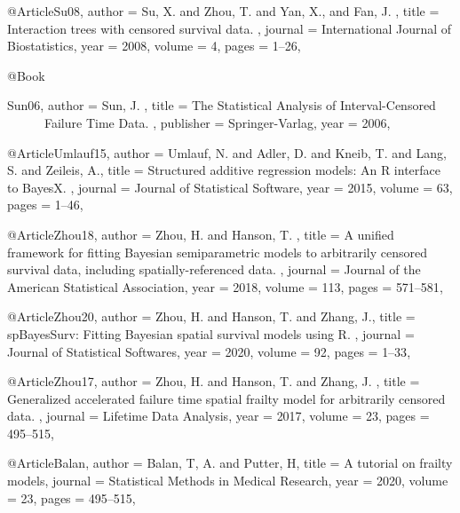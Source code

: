  

@Article{Su08,
   author =   {Su, X. and Zhou, T. and Yan, X., and Fan, J. },
   title =    { Interaction trees with censored survival data. },
   journal =      {International Journal of Biostatistics},
   year =     {2008},
   volume =   {4},
   pages =    {1--26},
 }

 


@Book{Sun06,
   author =   {Sun, J. },
   title =    { The Statistical Analysis of Interval-Censored
      Failure Time Data.  },
   publisher =      {Springer-Varlag},
   year =     {2006},
   
 }

 


@Article{Umlauf15,
   author =   {Umlauf, N. and Adler, D. and Kneib, T. and Lang, S. and Zeileis, A.},
   title =    { Structured additive regression models: An R interface to BayesX. },
   journal =      {Journal of Statistical Software},
   year =     {2015},
   volume =   {63},
   pages =    {1--46},
 }



@Article{Zhou18,
   author =   {Zhou, H. and Hanson, T. },
   title =    { A unified framework for fitting Bayesian semiparametric models to arbitrarily censored survival data, including spatially-referenced data.  },
   journal =      {Journal of the American Statistical Association},
   year =     {2018},
   volume =   {113},
   pages =    {571--581},
 }

 


@Article{Zhou20,
   author =   {Zhou, H. and Hanson, T. and Zhang, J.},
   title =    { spBayesSurv: Fitting Bayesian spatial survival
models using R.   },
   journal =      {Journal of Statistical Softwares},
   year =     {2020},
   volume =   {92},
   pages =    {1--33},
 }

 







@Article{Zhou17,
   author =   {Zhou, H. and Hanson, T. and Zhang, J. },
   title =    { Generalized accelerated failure time spatial frailty model for arbitrarily censored data. },
   journal =      {Lifetime Data Analysis},
   year =     {2017},
   volume =   {23},
   pages =    {495--515},
 }


@Article{Balan,
   author =   {Balan, T, A. and Putter, H},
   title =    { A tutorial on frailty models},
   journal =      {Statistical Methods in Medical Research},
   year =     {2020},
   volume =   {23},
   pages =    {495--515},
 }



